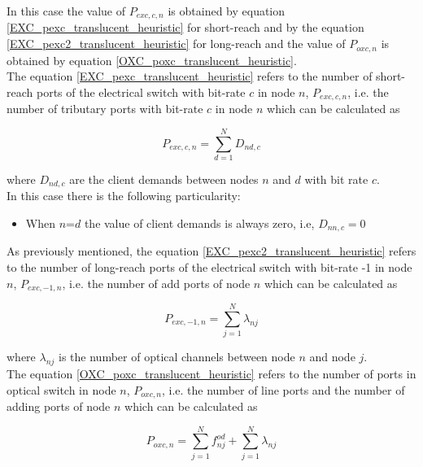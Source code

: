 In this case the value of $P_{exc,c,n}$ is obtained by equation \ref{EXC_pexc_translucent_heuristic} for short-reach and by the equation \ref{EXC_pexc2_translucent_heuristic} for long-reach and the value of $P_{oxc,n}$ is obtained by equation \ref{OXC_poxc_translucent_heuristic}.\\

The equation \ref{EXC_pexc_translucent_heuristic} refers to the number of short-reach ports of the electrical switch with bit-rate $c$ in node $n$, $P_{exc,c,n}$, i.e. the number of tributary ports with bit-rate $c$ in node $n$ which can be calculated as

\begin{equation}
P_{exc,c,n} = \sum_{d=1}^{N} D_{nd,c}
\label{EXC_pexc_translucent_heuristic}
\end{equation}

\vspace{11pt}
\noindent
where $D_{nd,c}$ are the client demands between nodes $n$ and $d$ with bit rate $c$.\\

In this case there is the following particularity:
\begin{itemize}
  \item When $n$=$d$ the value of client demands is always zero, i.e, $D_{nn,c}=0$
\end{itemize}

\vspace{11pt}
As previously mentioned, the equation \ref{EXC_pexc2_translucent_heuristic} refers to the number of long-reach ports of the electrical switch with bit-rate -1 in node $n$, $P_{exc,-1,n}$, i.e. the number of add ports of node $n$ which can be calculated as

\begin{equation}
P_{exc,-1,n} = \sum_{j=1}^{N} \lambda_{nj}
\label{EXC_pexc2_translucent_heuristic}
\end{equation}

\vspace{11pt}
\noindent
where $\lambda_{nj}$ is the number of optical channels between node $n$ and node $j$.\\

The equation \ref{OXC_poxc_translucent_heuristic} refers to the number of ports in optical switch in node $n$, $P_{oxc,n}$, i.e. the number of line ports and the number of adding ports of node $n$ which can be calculated as

\begin{equation}
P_{oxc,n} = \sum_{j=1}^{N} f_{nj}^{od} + \sum_{j=1}^{N} \lambda_{nj}
\label{OXC_poxc_translucent_heuristic}
\end{equation}

